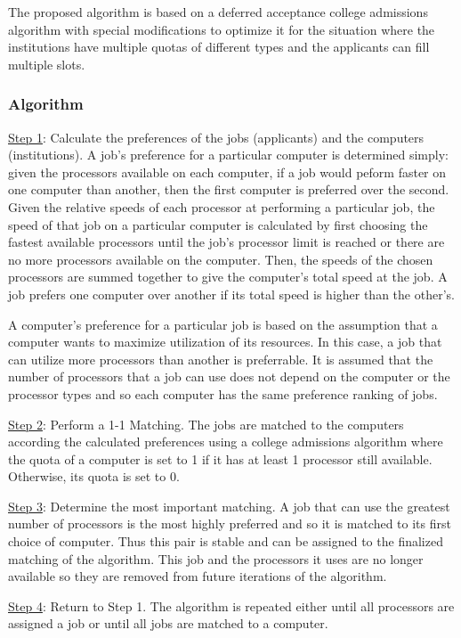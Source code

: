 \documentclass[conference]{IEEEtran}
\begin{document}
The proposed algorithm is based on a deferred acceptance
college admissions algorithm with special modifications to optimize it for 
the situation where the institutions have multiple quotas of different
types and the applicants can fill multiple slots.

\subsubsection{Algorithm}
\underline{Step 1}: Calculate the preferences of the jobs (applicants) and the computers
(institutions).
A job's preference for a particular computer is determined simply:
given the processors available on each computer, if a job would peform 
faster on one computer than another, then the first computer is preferred over the second. 
Given the relative speeds of each processor at performing a particular job,
the speed of that job on a particular computer is calculated by first choosing the fastest
available processors until the job's processor limit is reached or there are no more
processors available on the computer.
Then, the speeds of the chosen processors are summed together to give 
the computer's total speed at the job.
A job prefers one computer over another if its total speed
is higher than the other's. 

A computer's preference for a particular job is based on the assumption
that a computer wants to maximize utilization of its resources. 
In this case, a job that can utilize more processors than another
is preferrable. It is assumed that the number of processors that a job can use 
does not depend on the computer or the processor types and so each computer
has the same preference ranking of jobs.


\underline{Step 2}: Perform a 1-1 Matching.
The jobs are matched to the computers according the calculated preferences
using a college admissions algorithm where the quota of a computer is 
set to 1 if it has at least 1 processor still available. 
Otherwise, its quota is set to 0.

\underline{Step 3}: Determine the most important matching.
A job that can use the greatest number of processors is the
most highly preferred and so it is matched to its first choice
of computer. Thus this pair is stable and can be assigned to 
the finalized matching of the algorithm. 
This job and the processors it uses are no longer available
so they are removed from future iterations of the algorithm.

\underline{Step 4}: Return to Step 1.
The algorithm is repeated either until all processors are 
assigned a job or until all jobs are matched 
to a computer.
\end{document}
